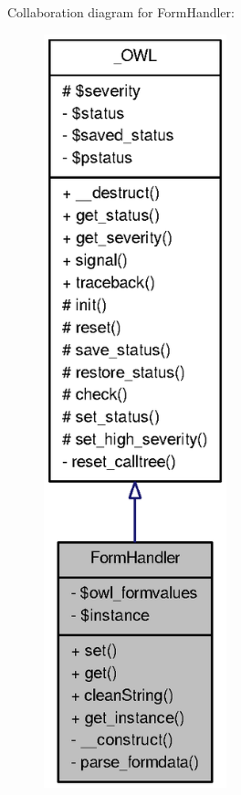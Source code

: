 Collaboration diagram for FormHandler:\nopagebreak
\begin{figure}[H]
\begin{center}
\leavevmode
\includegraphics[width=150pt]{classFormHandler__coll__graph}
\end{center}
\end{figure}

